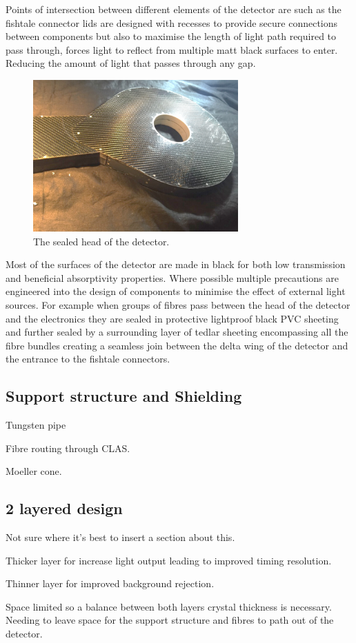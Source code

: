 Points of intersection between different elements of the detector are such as the fishtale connector lids are designed with recesses to provide secure connections between components but also to maximise the length of light path required to pass through, forces light to reflect from multiple matt black surfaces to enter. Reducing the amount of light that passes through any gap. 

\begin{figure}
	\centering
	\includegraphics[width=0.7\textwidth]{ImgChap1/sealed}
	\caption{The sealed head of the detector.}		
	\label{sealedlollypop2}
\end{figure}

Most of the surfaces of the detector are made in black for both low transmission and beneficial absorptivity properties. Where possible multiple precautions are engineered into the design of components to minimise the effect of external light sources. For example when groups of fibres pass between the head of the detector and the electronics they are sealed in protective lightproof black PVC sheeting and further sealed by a surrounding layer of tedlar sheeting encompassing all the fibre bundles creating a seamless join between the delta wing of the detector and the entrance to the fishtale connectors. 

%
%
%
%

\subsection{Support structure and Shielding}

Tungsten pipe

Fibre routing through CLAS.

Moeller cone.

\subsection{2 layered design}

Not sure where it's best to insert a section about this.

Thicker layer for increase light output leading to improved timing resolution.

Thinner layer for improved background rejection.

Space limited so a balance between both layers crystal thickness is necessary. Needing to leave space for the support structure and fibres to path out of the detector.